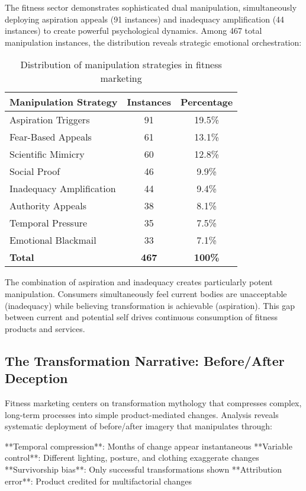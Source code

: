 The fitness sector demonstrates sophisticated dual manipulation, simultaneously deploying aspiration appeals (91 instances) and inadequacy amplification (44 instances) to create powerful psychological dynamics. Among 467 total manipulation instances, the distribution reveals strategic emotional orchestration:

\begin{table}[h]
\centering
\begin{tabular}{|l|c|c|}
\hline
\textbf{Manipulation Strategy} & \textbf{Instances} & \textbf{Percentage} \\
\hline
Aspiration Triggers & 91 & 19.5\% \\
Fear-Based Appeals & 61 & 13.1\% \\
Scientific Mimicry & 60 & 12.8\% \\
Social Proof & 46 & 9.9\% \\
Inadequacy Amplification & 44 & 9.4\% \\
Authority Appeals & 38 & 8.1\% \\
Temporal Pressure & 35 & 7.5\% \\
Emotional Blackmail & 33 & 7.1\% \\
\hline
\textbf{Total} & \textbf{467} & \textbf{100\%} \\
\hline
\end{tabular}
\caption{Distribution of manipulation strategies in fitness marketing}
\end{table}

The combination of aspiration and inadequacy creates particularly potent manipulation. Consumers simultaneously feel current bodies are unacceptable (inadequacy) while believing transformation is achievable (aspiration). This gap between current and potential self drives continuous consumption of fitness products and services.

\subsection{The Transformation Narrative: Before/After Deception}

Fitness marketing centers on transformation mythology that compresses complex, long-term processes into simple product-mediated changes. Analysis reveals systematic deployment of before/after imagery that manipulates through:

**Temporal compression**: Months of change appear instantaneous
**Variable control**: Different lighting, posture, and clothing exaggerate changes
**Survivorship bias**: Only successful transformations shown
**Attribution error**: Product credited for multifactorial changes

